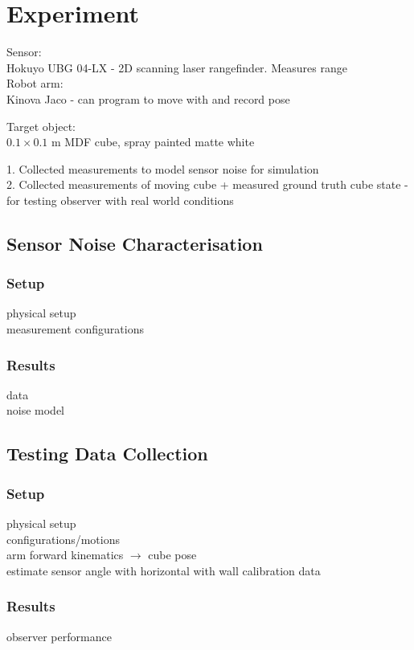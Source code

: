 \chapter{Experiment}
Sensor:\\
Hokuyo UBG 04-LX - 2D scanning laser rangefinder. Measures range\\

Robot arm: \\
Kinova Jaco - can program to move with and record pose

Target object: \\
$0.1 \times 0.1$ m MDF cube, spray painted matte white

1. Collected measurements to model sensor noise for simulation\\
2. Collected measurements of moving cube + measured ground truth cube state - for testing observer with real world conditions

\section{Sensor Noise Characterisation}
	\subsection{Setup}
		physical setup\\
		measurement configurations 
	\subsection{Results}
		data\\
		noise model

\section{Testing Data Collection}
	\subsection{Setup}
		physical setup\\
		configurations/motions\\
		arm forward kinematics $\rightarrow$ cube pose\\
		estimate sensor angle with horizontal with wall calibration data		
		
	\subsection{Results}
		observer performance

